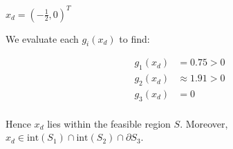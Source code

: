$ x_d = \left(-\frac{1}{2}, 0\right)^T$

\begin{solution}
  We evaluate each $g_i(x_d)$ to find:

  \begin{align*}
    g_1(x_d) &= 0.75 > 0 \\
    g_2(x_d) &\approx 1.91 > 0 \\
    g_3(x_d) &= 0 \\
  \end{align*}

  Hence $x_d$ lies within the feasible region $S$. Moreover, $x_d \in \text{int}(S_1) \cap \text{int}(S_2) \cap \partial S_3 $.
  \ \\
\end{solution}
